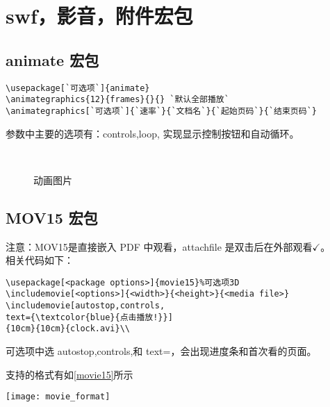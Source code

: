 \section{swf，影音，附件宏包}
\subsection{animate 宏包}

\begin{lstlisting}
\usepackage[`可选项`]{animate}
\animategraphics{12}{frames}{}{} `默认全部播放`
\animategraphics[`可选项`]{`速率`}{`文档名`}{`起始页码`}{`结束页码`}
\end{lstlisting}

参数中主要的选项有：controls,loop, 实现显示控制按钮和自动循环。

\begin{figure}[htbp]%
\centering
{}\\
\caption{动画图片} \label{mov}
\end{figure}


\subsection{MOV15 宏包}

\color{red}
注意：MOV15是直接嵌入 PDF 中观看，attachfile 是双击后在外部观看$\checkmark $。\\
\normalcolor
相关代码如下：
\begin{shaded}
\begin{Verbatim}
\usepackage[<package options>]{movie15}%可选项3D
\includemovie[<options>]{<width>}{<height>}{<media file>}
\includemovie[autostop,controls,
text={\textcolor{blue}{点击播放!}}]
{10cm}{10cm}{clock.avi}\\
\end{Verbatim}
\end{shaded}


可选项中选 autostop,controls,和 text={}，会出现进度条和首次看的页面。

支持的格式有如\ref{movie15}所示\\
\begin{table}[ht]
  \centering
   \caption{movie15 宏包支持格式}\label{movie15}
  \texttt{[image: movie\_format]}\\

\end{table}

